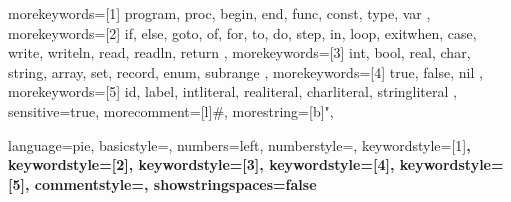 {
    morekeywords={[1]
        program,
        proc,
        begin,
        end,
        func,
        const,
        type, 
        var
    },
    morekeywords={[2]
        if,
        else,
        goto,
        of, %
        for,
        to, %
        do, %
        step, %
        in, %
        loop,
        exitwhen, %
        case,
        write,
        writeln,
        read,
        readln,
        return
    },
    morekeywords={[3]
        int,
        bool,
        real,
        char,
        string,
        array,
        set,
        record,
        enum,
        subrange
    },
    morekeywords={[4]
        true, false, nil
    },
    morekeywords={[5]
        id,
        label,
        intliteral,
        realiteral,
        charliteral,
        stringliteral
    },
    sensitive=true,
    morecomment=[l]{\#},
    morestring=[b]",
}



{
    language=pie,
    basicstyle=\ttfamily,
    numbers=left,
    numberstyle=\tiny,
    keywordstyle=[1]\bfseries\color{keywordcolor},
    keywordstyle=[2]\bfseries\color{keywordcolor},
    keywordstyle=[3]\bfseries\color{keywordcolor},
    keywordstyle=[4]\bfseries\color{literalcolor},
    keywordstyle=[5]\bfseries\color{todefine},
    commentstyle=\color{commentcolor},
    showstringspaces=false
}

\lstset{style=pie}

%